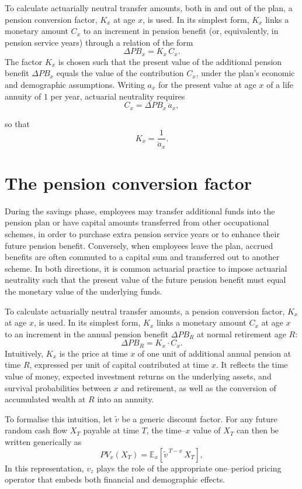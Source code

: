 \documentclass[
  letterpaper,
  DIV=11,
  numbers=noendperiod]{scrreprt}
\begin{document}
To calculate actuarially neutral transfer amounts, both in and out of
the plan, a pension conversion factor, \(K_x\) at age \(x\), is used. In
its simplest form, \(K_x\) links a monetary amount \(C_x\) to an
increment in pension benefit (or, equivalently, in pension service
years) through a relation of the form \[
    \Delta PB_x = K_x \, C_x.
\] The factor \(K_x\) is chosen such that the present value of the
additional pension benefit \(\Delta PB_x\) equals the value of the
contribution \(C_x\), under the plan's economic and demographic
assumptions. Writing \(a_x\) for the present value at age \(x\) of a
life annuity of \(1\) per year, actuarial neutrality requires \[
    C_x = \Delta PB_x \, \ddot{a}_x,
\]

so that \[
    K_x = \frac{1}{\ddot{a}_x}.
\]

\section{The pension conversion factor}\label{subsec:conversionFactor}

During the savings phase, employees may transfer additional funds into
the pension plan or have capital amounts transferred from other
occupational schemes, in order to purchase extra pension service years
or to enhance their future pension benefit. Conversely, when employees
leave the plan, accrued benefits are often commuted to a capital sum and
transferred out to another scheme. In both directions, it is common
actuarial practice to impose actuarial neutrality such that the present
value of the future pension benefit must equal the monetary value of the
underlying funds.

To calculate actuarially neutral transfer amounts, a pension conversion
factor, \(K_x\) at age \(x\), is used. In its simplest form, \(K_x\)
links a monetary amount \(C_x\) at age \(x\) to an increment in the
annual pension benefit \(\Delta PB_R\) at normal retirement age \(R\):
\[
    \Delta PB_R = K_x \cdot C_x.
\] Intuitively, \(K_x\) is the price at time \(x\) of one unit of
additional annual pension at time \(R\), expressed per unit of capital
contributed at time \(x\). It reflects the time value of money, expected
investment returns on the underlying assets, and survival probabilities
between \(x\) and retirement, as well as the conversion of accumulated
wealth at \(R\) into an annuity.

To formalise this intuition, let \(\tilde{v}\) be a generic discount
factor. For any future random cash flow \(X_T\) payable at time \(T\),
the time--\(x\) value of \(X_T\) can then be written generically as \[
    PV_x(X_T) = \mathbb{E}_x\!\left[ \tilde{v}^{\,T-x} \, X_T \right],
\] In this representation, \(v_z\) plays the role of the appropriate
one--period pricing operator that embeds both financial and demographic
effects.
\end{document}
